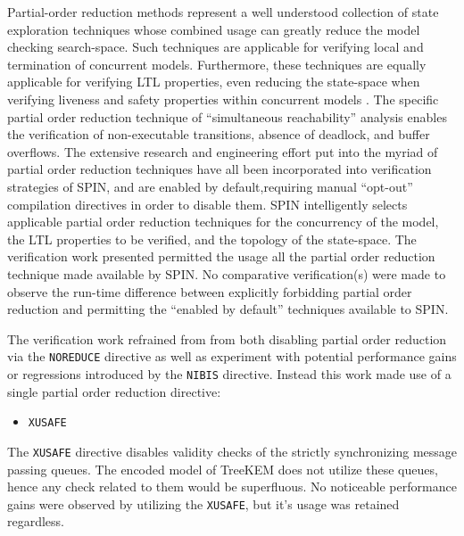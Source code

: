 Partial-order reduction methods represent a well understood collection of state exploration techniques \autocite{godefroid1990using, godefroid1991using, godefroid1994partial, holzmann1995improvement, katz1992verification, peled1993all, valmari1989stubborn, valmari1992stubborn} whose combined usage can greatly reduce the model checking search-space.
Such techniques are applicable for verifying local and termination of concurrent models.
Furthermore, these techniques are equally applicable for verifying LTL properties, even reducing the state-space when verifying liveness and safety properties within concurrent models \autocite{wolper1983reasoning}.
The specific partial order reduction technique of ``simultaneous reachability'' analysis \autocite{van1997partial} enables the verification of non-executable transitions, absence of deadlock, and buffer overflows.
The extensive research and engineering effort put into the myriad of partial order reduction techniques have all been incorporated into verification strategies of SPIN, and are enabled by default,requiring manual ``opt-out'' compilation directives in order to disable them.
SPIN intelligently selects applicable partial order reduction techniques for the concurrency of the model, the LTL properties to be verified, and the topology of the state-space.
The verification work presented permitted the usage all the partial order reduction technique made available by SPIN.
No comparative verification(s) were made to observe the run-time difference between explicitly forbidding partial order reduction and permitting the ``enabled by default'' techniques available to SPIN.

The verification work refrained from from both disabling partial order reduction via the \texttt{NOREDUCE} directive as well as experiment with potential performance gains or regressions introduced by the \texttt{NIBIS} directive.
Instead this work made use of a single partial order reduction directive:

\begin{itemize}
\item \texttt{XUSAFE}
\end{itemize}

The \texttt{XUSAFE} directive disables validity checks of the strictly synchronizing message passing queues.
The encoded model of TreeKEM does not utilize these queues, hence any check related to them would be superfluous.
No noticeable performance gains were observed by utilizing the \texttt{XUSAFE}, but it's usage was retained regardless.


